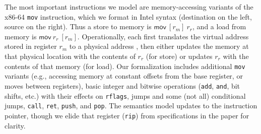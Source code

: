 The most important instructions we model are memory-accessing variants of the x86-64 \lstinline|mov| instruction, which we format in Intel syntax
(destination on the left, source on the right).
Thus a store to memory is $\textsf{mov}~[r_m]~r_r$, and a load from memory is $\textsf{mov}~r_r~[r_m]$.
Operationally, each first translates the virtual address stored in register $r_m$ to a physical address ,
then either updates the memory at that physical location with the contents of $r_r$ (for store)
or updates $r_r$ with the contents of that memory (for load).
Our formalization includes
additional \lstinline|mov| variants (e.g., accessing memory at constant offsets from the base register, or moves between registers),
basic integer and bitwise operations (\lstinline|add|,
\lstinline|and|, bit shifts, etc.) with their effects on \lstinline|rflags|, jumps and some (not all) conditional jumps, \lstinline|call|, \lstinline|ret|, \lstinline|push|,
and \lstinline|pop|.
The semantics model updates to the instruction pointer, though we elide that register (\lstinline|rip|)
from specifications in the paper for clarity.
